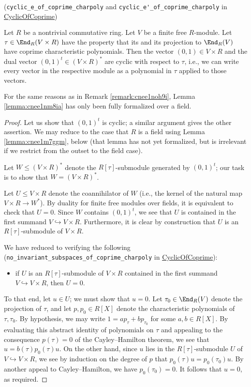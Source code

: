 \documentclass[reqno]{amsart} 
\begin{document}
\begin{lemma}\label{lemma:cnee1nm8ia}
  (\verb|cyclic_e_of_coprime_charpoly| and \verb|cyclic_e'_of_coprime_charpoly| in \href{CyclicOfCoprime.lean}{CyclicOfCoprime})

  Let $R$ be a nontrivial commutative ring.  Let $V$ be a finite free $R$-module.  Let $\tau \in \End_R(V \times R)$ have the property that its and its projection to $\End_R(V)$ have coprime characteristic polynomials.  Then the vector $(0,1) \in V \times R$ and the dual vector $(0,1)^t \in (V \times R)^*$ are cyclic with respect to $\tau$, i.e., we can write every vector in the respective module as a polynomial in $\tau$ applied to those vectors.
\end{lemma}
\begin{remark}
  For the same reasons as in Remark \ref{remark:cnee1noh9i}, Lemma \ref{lemma:cnee1nm8ia} has only been fully formalized over a field.
\end{remark}
\begin{proof}
  Let us show that $(0,1)^t$ is cyclic; a similar argument gives the other assertion.  We may reduce to the case that $R$ is a field using Lemma \ref{lemma:cnee1m7ggm}, below (that lemma has not yet formalized, but is irrelevant if we restrict from the outset to the field case).

  Let $W \leq (V \times R)^*$ denote the $R[\tau]$-submodule generated by $(0,1)^t$; our task is to show that $W = (V \times R)^*$.

  Let $U \leq V \times R$ denote the coannihilator of $W$ (i.e., the kernel of the natural map $V \times R \rightarrow W^*$).  By duality for finite free modules over fields, it is equivalent to check that $U = 0$.  Since $W$ contains $(0,1)^t$, we see that $U$ is contained in the first summand $V \hookrightarrow V \times R$.  Furthermore, it is clear by construction that $U$ is an $R[\tau]$-submodule of $V \times R$.

  We have reduced to verifying the following (\verb|no_invariant_subspaces_of_coprime_charpoly| in \href{CyclicOfCoprime.lean}{CyclicOfCoprime}):
  \begin{itemize}
  \item if $U$ is an $R[\tau]$-submodule of $V \times R$ contained in the first summand $V \hookrightarrow V \times R$, then $U = 0$.
  \end{itemize}

  To that end, let $u \in U$; we must show that $u = 0$.  Let $\tau_0 \in \End_R(V)$ denote the projection of $\tau$, and let $p, p_0 \in R[X]$ denote the characteristic polynomials of $\tau, \tau_0$.  By hypothesis, we may write $1 = a p_\tau + b p_{\tau_0}$ for some $a, b \in R[X]$.  By evaluating this abstract identity of polynomials on $\tau$ and appealing to the consequence $p(\tau) = 0$ of the Cayley--Hamilton theorem, we see that $u = b(\tau) p_0(\tau) u$.  On the other hand, since $u$ lies in the $R[\tau]$-submodule $U$ of $V \hookrightarrow V \times R$, we see by induction on the degree of $p$ that $p_0(\tau) u = p_0(\tau_0) u$.  By another appeal to Cayley--Hamilton, we have $p_0(\tau_0) = 0$.  It follows that $u = 0$, as required.
\end{proof}
\end{document}
